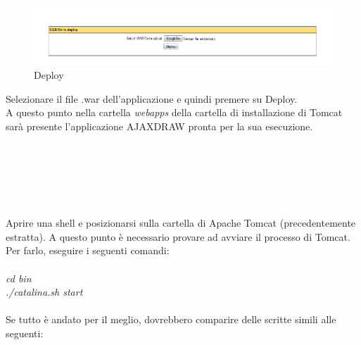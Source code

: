 \begin{figure}[!ht]
\centering
\includegraphics[scale=0.7]{images/DeployTomcat.png}
\caption{Deploy}
\end{figure}
 
Selezionare il file .war dell'applicazione e quindi premere su Deploy.\\
A questo punto nella cartella \textit{webapps} della cartella di installazione di Tomcat sar\`a presente l'applicazione AJAXDRAW pronta per la sua esecuzione.\\
\\\\
\\\\
\\
\\
Aprire una shell e posizionarsi sulla cartella di Apache Tomcat (precedentemente estratta).
A questo punto \`e necessario provare ad avviare il processo di Tomcat. Per farlo, eseguire i seguenti comandi:\\
\\
\textit{cd bin}\\
\textit{./catalina.sh start}\\
\\
Se tutto \`e andato per il meglio, dovrebbero comparire delle scritte simili alle seguenti:\\
 
